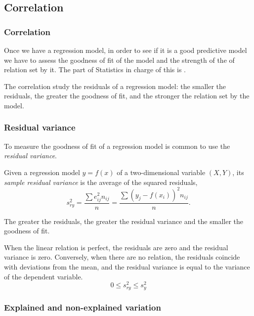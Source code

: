 \subsection{Correlation}
\begin{frame}
\frametitle{Correlation}
Once we have a regression model, in order to see if it is a good predictive model we have to assess the goodness of fit of the model and the strength of the of relation set by it. 
The part of Statistics in charge of this is .

The correlation study the residuals of a regression model: the smaller the residuals, the greater the goodness of fit, and the stronger the relation set by the model. 
\end{frame}


\begin{frame}
\frametitle{Residual variance}
To measure the goodness of fit of a regression model is common to use the \emph{residual variance}.
\begin{definition}
Given a regression model $y=f(x)$ of a two-dimensional variable $(X,Y)$, its \emph{sample residual variance} is the average of the squared residuals,
\[
s_{ry}^2 = \frac{\sum e_{ij}^2n_{ij}}{n} = \frac{\sum (y_j - f(x_i))^2n_{ij}}{n}.
\]
\end{definition}

The greater the residuals, the greater the residual variance and the smaller the goodness of fit. 

When the linear relation is perfect, the residuals are zero and the residual variance is zero. 
Conversely, when there are no relation, the residuals coincide with deviations from the mean, and the residual
variance is equal to the variance of the dependent variable.
\[
0\leq s_{ry}^2\leq s_y^2
\]
\end{frame}


\begin{frame}
\frametitle{Explained and non-explained variation}
\begin{center}
\end{center}
\end{frame}


